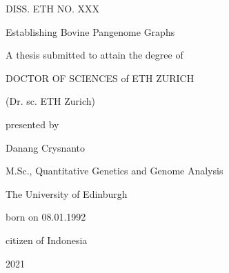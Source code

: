 \documentclass[../main.tex]{subfiles}
\begin{document}
\setlength{\parskip}{0pt}
\begin{center}
    \thispagestyle{empty}

    DISS. ETH NO. XXX 

    \vspace{2cm}

    \doublespacing
    
    {\LARGE Establishing Bovine Pangenome Graphs}
    

    \vspace{2cm}
    
    
    A thesis submitted to attain the degree of

    DOCTOR OF SCIENCES of ETH ZURICH

    (Dr. sc. ETH Zurich)
    \vspace{1cm}

    presented by

    \vspace{1cm}
    Danang Crysnanto  

    \vspace{1cm}

    M.Sc., Quantitative Genetics and Genome Analysis 
    
    The University of Edinburgh

    \vspace{1cm}

    born on 08.01.1992

    citizen of Indonesia

    \vspace{2cm}

    \vspace{2cm}

    \vspace{0.5cm}
    2021
\end{center}
\end{document}
